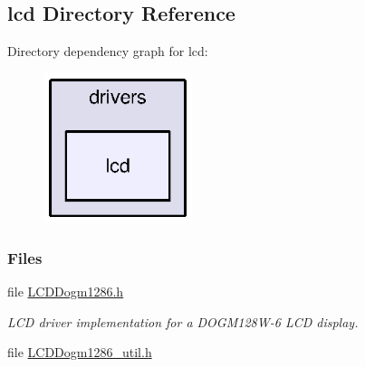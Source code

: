 \subsection{lcd Directory Reference}
\label{dir_3549aaa9e7c92504e133d69437e057d5}
Directory dependency graph for lcd\-:
\nopagebreak
\begin{figure}[H]
\begin{center}
\leavevmode
\includegraphics[width=123pt]{dir_3549aaa9e7c92504e133d69437e057d5_dep}
\end{center}
\end{figure}
\subsubsection*{Files}
\begin{DoxyCompactItemize}
\item 
file \hyperlink{_l_c_d_dogm1286_8h}{L\-C\-D\-Dogm1286.\-h}
\begin{DoxyCompactList}\small\item\em L\-C\-D driver implementation for a D\-O\-G\-M128\-W-\/6 L\-C\-D display. \end{DoxyCompactList}\item 
file \hyperlink{_l_c_d_dogm1286__util_8h}{L\-C\-D\-Dogm1286\-\_\-util.\-h}
\end{DoxyCompactItemize}
